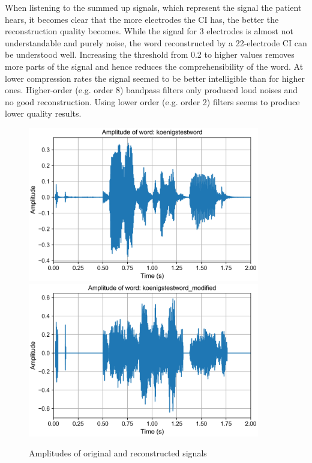 \documentclass{scrartcl}
\begin{document}
When listening to the summed up signals, which represent the signal the patient hears, it becomes clear that the more electrodes the CI has, the better the reconstruction quality becomes. While the signal for 3 electrodes is almost not understandable and purely noise, the word reconstructed by a 22-electrode CI can be understood well. Increasing the threshold from 0.2 to higher values removes more parts of the signal and hence reduces the comprehensibility of the word. At lower compression rates the signal seemed to be better intelligible than for higher ones. Higher-order (e.g. order 8) bandpass filters only produced loud noises and no good reconstruction. Using lower order (e.g. order 2) filters seems to produce lower quality results. 

\begin{figure}[p]
	\centering
	\includegraphics[width=0.9\textwidth]{figures/amplitude_koenigstestword}
	\includegraphics[width=0.9\textwidth]{figures/amplitude_koenigstestword_modified}
	\caption{Amplitudes of original and reconstructed signals}
	\label{fig:amp}
\end{figure}
\end{document}
